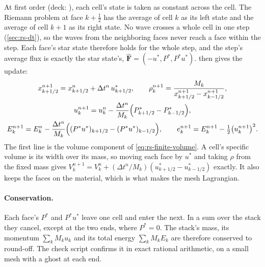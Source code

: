 At first order (deck: ), each cell's state is taken as
constant across the cell. The Riemann problem at face $k + \tfrac{1}{2}$
has the average of cell $k$ as its left state and the average of cell
$k + 1$ as its right state. No wave crosses a whole cell in one step
(\cref{sec:rs-dt}), so the waves from the neighboring faces never reach a
face within the step. Each face's star state therefore holds for the whole
step, and the step's average flux is exactly the star state's,
$\hat{\mathbf{F}} = (-u^*, P^*, P^*u^*)$.  then
gives the update:
\begin{gather}
x^{n+1}_{k+1/2} = x^n_{k+1/2} + \Delta t^n\,u^*_{k+1/2},
\qquad
\rho^{n+1}_k = \frac{M_k}{x^{n+1}_{k+1/2} - x^{n+1}_{k-1/2}},
\label{eq:rs-position}\\
u^{n+1}_k = u^n_k - \frac{\Delta t^n}{M_k}\Bigl(P^*_{k+1/2} - P^*_{k-1/2}\Bigr),
\label{eq:rs-momentum}\\
E^{n+1}_k = E^n_k - \frac{\Delta t^n}{M_k}\Bigl((P^*u^*)_{k+1/2} - (P^*u^*)_{k-1/2}\Bigr),
\qquad
e^{n+1}_k = E^{n+1}_k - \tfrac{1}{2}\bigl(u^{n+1}_k\bigr)^2 .
\label{eq:rs-energy}
\end{gather}
The first line is the volume component of \cref{eq:rs-finite-volume}. A
cell's specific volume is its width over its mass, so moving each face by
$u^*$ and taking $\rho$ from the fixed mass gives $V^{n+1}_k = V^n_k +
(\Delta t^n/M_k)(u^*_{k+1/2} - u^*_{k-1/2})$ exactly. It also keeps the
faces on the material, which is what makes the mesh Lagrangian.

\paragraph{Conservation.} Each face's $P^*$ and $P^*u^*$ leave one cell and
enter the next. In a sum over the stack they cancel, except at the two ends,
where $P^* = 0$. The stack's mass, its momentum $\sum_k M_k u_k$ and its
total energy $\sum_k M_k E_k$ are therefore conserved to round-off. The
check script confirms it in exact rational arithmetic, on a small mesh with
a ghost at each end.

